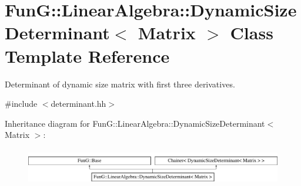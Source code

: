\hypertarget{classFunG_1_1LinearAlgebra_1_1DynamicSizeDeterminant}{\section{Fun\-G\-:\-:Linear\-Algebra\-:\-:Dynamic\-Size\-Determinant$<$ Matrix $>$ Class Template Reference}
\label{classFunG_1_1LinearAlgebra_1_1DynamicSizeDeterminant}
}


Determinant of dynamic size matrix with first three derivatives.  




{\ttfamily \#include $<$determinant.\-hh$>$}

Inheritance diagram for Fun\-G\-:\-:Linear\-Algebra\-:\-:Dynamic\-Size\-Determinant$<$ Matrix $>$\-:\begin{figure}[H]
\begin{center}
\leavevmode
\includegraphics[height=1.632653cm]{classFunG_1_1LinearAlgebra_1_1DynamicSizeDeterminant}
\end{center}
\end{figure}
